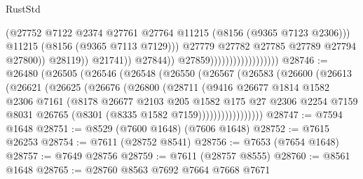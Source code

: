 \begin{lexlean}{RustStd}
\begin{coremodule}
                                                          (@27752
                                                            @7122
                                                            @2374
                                                            @27761
                                                            @27764
                                                            @11215
                                                            (@8156 (@9365 @7123 @2306)))
                                                          @11215
                                                          (@8156 (@9365 @7113 @7129)))
                                                        @27779
                                                        @27782
                                                        @27785
                                                        @27789
                                                        @27794
                                                        @27800))
                                                    @28119))
                                                @21741))
                                            @27844))
                                        @27859))))))))))))))))))
@28746 := @26480
    (@26505
      (@26546
        (@26548
          (@26550
            (@26567
              (@26583
                (@26600
                  (@26613
                    (@26621
                      (@26625
                        (@26676
                          (@26800
                            (@28711
                              (@9416
                                @26677
                                @1814
                                @1582
                                @2306
                                @7161
                                (@8178
                                  @26677
                                  @2103
                                  @205
                                  @1582
                                  @175
                                  @27
                                  @2306
                                  @2254
                                  @7159
                                  @8031
                                  @26765
                                  (@8301 (@8335 @1582 @7159)))))))))))))))))
@28747 := @7594 @1648
@28751 := @8529 (@7600 @1648) (@7606 @1648)
@28752 := @7615 @26253
@28754 := @7611 (@28752 @8541)
@28756 := @7653 (@7654 @1648)
@28757 := @7649 @28756
@28759 := @7611 (@28757 @8555)
@28760 := @8561 @1648
@28765 := @28760 @8563 @7692 @7664 @7668 @7671

\end{coremodule}
\end{lexlean}
